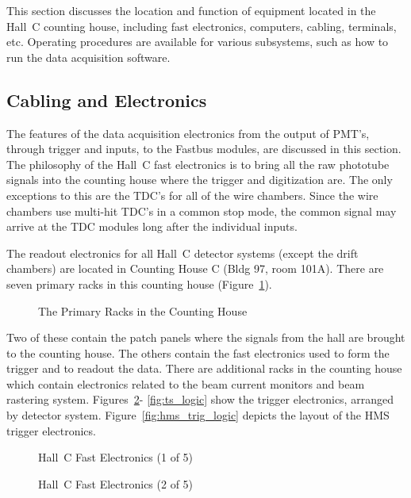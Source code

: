 This section discusses the location and function of equipment located in the
Hall~C counting house, including fast electronics, computers, cabling,
terminals, etc.
Operating procedures are available for various subsystems, such as how to
run the data acquisition software.

\subsection{Cabling and Electronics}

The features of the data acquisition
electronics from the output of PMT's, through trigger and inputs, to
the Fastbus modules, are discussed in this section.
The philosophy of the Hall~C fast electronics is to bring all the
raw phototube signals into the counting house where the trigger and
digitization are. The only exceptions to this are the TDC's for all of
the wire chambers. Since the wire chambers use multi-hit TDC's in a
common stop mode, the common signal may arrive at the TDC modules long
after the individual inputs.

The readout electronics for all Hall~C detector systems (except the
drift chambers) are located in Counting House C (Bldg 97, room 101A).
There are seven primary racks in this counting house (Figure~\ref{fig:7.1}). 
\begin{figure}
\caption{The Primary Racks in the Counting House\label{fig:7.1}}
\end{figure}
Two of these
contain the patch panels where the signals from the hall are
brought to the counting
house. The others contain the fast electronics used to form the trigger and to
readout the data. There are additional racks in the counting house
which contain electronics
related to the beam current monitors and beam rastering system. Figures~\ref{fig:7.2}-
\ref{fig:ts_logic} show the trigger electronics, arranged by detector system. Figure~\ref{fig:hms_trig_logic} depicts
the layout of the HMS trigger electronics.

\begin{figure}
\caption{Hall~C Fast Electronics (1 of 5) \label{fig:7.2}}
\end{figure}
\clearpage

\begin{figure}
\caption{Hall~C Fast Electronics (2 of 5) \label{fig:7.3}}
\end{figure}
\clearpage

